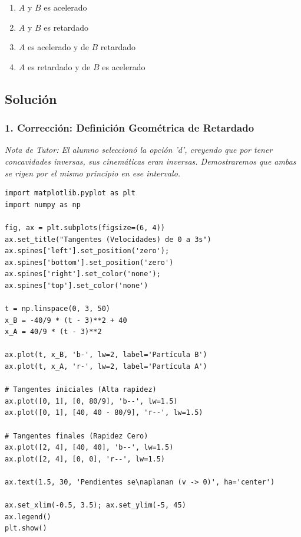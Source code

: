 \documentclass[12pt, a4paper]{article}
\begin{document}
\begin{enumerate}[label=\alph*)]
    \item $A$ y $B$ es acelerado
    \item $A$ y $B$ es retardado
    \item $A$ es acelerado y de $B$ retardado
    \item $A$ es retardado y de $B$ es acelerado
\end{enumerate}

\subsection*{Solución}

\subsubsection*{1. Corrección: Definición Geométrica de Retardado}
\textit{Nota de Tutor: El alumno seleccionó la opción 'd', creyendo que por tener concavidades inversas, sus cinemáticas eran inversas. Demostraremos que ambas se rigen por el mismo principio en ese intervalo.}

\begin{lstlisting}
import matplotlib.pyplot as plt
import numpy as np

fig, ax = plt.subplots(figsize=(6, 4))
ax.set_title("Tangentes (Velocidades) de 0 a 3s")
ax.spines['left'].set_position('zero'); ax.spines['bottom'].set_position('zero')
ax.spines['right'].set_color('none'); ax.spines['top'].set_color('none')

t = np.linspace(0, 3, 50)
x_B = -40/9 * (t - 3)**2 + 40
x_A = 40/9 * (t - 3)**2

ax.plot(t, x_B, 'b-', lw=2, label='Partícula B')
ax.plot(t, x_A, 'r-', lw=2, label='Partícula A')

# Tangentes iniciales (Alta rapidez)
ax.plot([0, 1], [0, 80/9], 'b--', lw=1.5)
ax.plot([0, 1], [40, 40 - 80/9], 'r--', lw=1.5)

# Tangentes finales (Rapidez Cero)
ax.plot([2, 4], [40, 40], 'b--', lw=1.5)
ax.plot([2, 4], [0, 0], 'r--', lw=1.5)

ax.text(1.5, 30, 'Pendientes se\naplanan (v -> 0)', ha='center')

ax.set_xlim(-0.5, 3.5); ax.set_ylim(-5, 45)
ax.legend()
plt.show()
\end{lstlisting}
\end{document}
